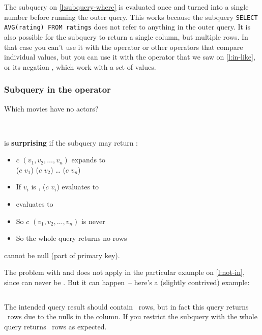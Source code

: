 The subquery on \autoref{l:subquery-where} is evaluated once and turned into a single number before running the outer query.
This works because the subquery \texttt{SELECT AVG(rating) FROM ratings} does not refer to anything in the outer query.
It is also possible for the subquery to return a single column, but multiple rows.
In that case you can't use it with the \code{>} operator or other operators that compare individual values, but you can use it with the  operator that we saw on \autoref{l:in-like}, or its negation , which work with a set of values.

\begin{frame}
    \label{s:not-in}
    \frametitle{Subquery in the  operator}
    Which movies have no actors?
    \inputminted[fontsize=\footnotesize]{sql}{code/sql-not-in.sql}
    \vspace{0.3em}
    {\footnotesize}\\[0.8em]\pause
    \emojiwarning{}
     is \textbf{surprising} if the subquery may return :
    \begin{itemize}
        \item $c$  $(v_1, v_2, \dots, v_n)$ expands to\\
            ($c$ \code{<>} $v_1$)  ($c$ \code{<>} $v_2$)  \dots {} ($c$ \code{<>} $v_n$)
        \item If $v_i$ is , ($c$ \code{<>} $v_i$) evaluates to 
        \item {} evaluates to 
        \item So $c$  $(v_1, v_2, \dots, v_n)$ is never 
        \item So the whole query returns no rows
    \end{itemize}
     cannot be null (part of primary key).
\end{frame}
\label{l:not-in}

The problem with  and  does not apply in the particular example on \autoref{l:not-in}, since  can never be .
But it can happen~-- here's a (slightly contrived) example:
\begin{quote}\inputminted{sql}{code/sql-not-in-deathyear.sql}\end{quote}

The intended query result should contain \qcountnullinright\ rows, but in fact this query returns \qcountnullinwrong\ rows due to the nulls in the  column.
If you restrict the subquery with  the whole query returns \qcountnullinright\ rows as expected.

